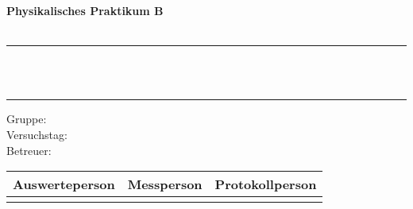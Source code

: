 \begin{titlepage}


    \begin{center}
       {\Huge\sffamily\textbf{Physikalisches Praktikum B}} \\
        \vspace{2mm}
        {\Huge \sffamily \Semester}\\ 
        \vspace{20mm}

        \noindent\rule[1ex]{\textwidth}{2pt}

        \vspace{10mm}
        {\Huge\sffamily\textbf \Versuchstitel} \\
        \vspace{5mm}
        {\huge\sffamily \Versuchsuntertitel}\\
        \vspace{10mm}
        \noindent\rule[1ex]{\textwidth}{2pt}



        

        \vspace{20mm}
        {\LARGE\sffamily Gruppe: \Gruppennummer}\\
        \vspace{2mm}
        {\LARGE\sffamily Versuchstag: \Versuchsdatum} \\
        \vspace{2mm}
        {\LARGE\sffamily Betreuer: \Betreuer}\\

        \vspace{90mm}
        \begin{tabular}{ccc}
            {\sffamily Auswerteperson} & {\sffamily Messperson} & {\sffamily Protokollperson}
            \vspace{2mm} 
            \\
            \hline
            \rule{0pt}{17pt}


\end{tabular}
\end{center}
\end{titlepage}
